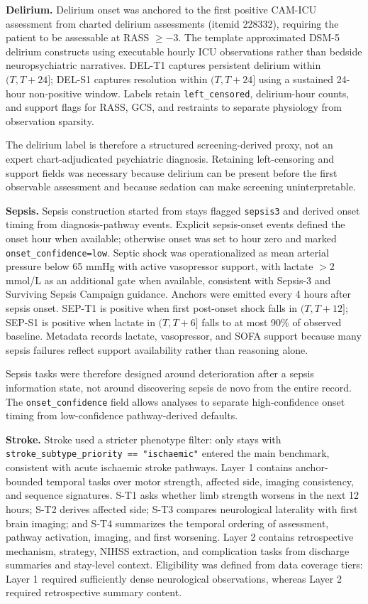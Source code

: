 \documentclass[pdflatex,sn-nature]{sn-jnl}
\begin{document}
\noindent\textbf{Delirium.} Delirium onset was anchored to the first positive CAM-ICU assessment from charted delirium assessments (itemid 228332), requiring the patient to be assessable at RASS $\geq -3$\cite{ely2001camicu}. The template approximated DSM-5 delirium constructs using executable hourly ICU observations rather than bedside neuropsychiatric narratives\cite{apa2013dsm5}. DEL-T1 captures persistent delirium within $(T, T+24]$; DEL-S1 captures resolution within $(T, T+24]$ using a sustained 24-hour non-positive window. Labels retain \texttt{left\_censored}, delirium-hour counts, and support flags for RASS, GCS, and restraints to separate physiology from observation sparsity.

The delirium label is therefore a structured screening-derived proxy, not an expert chart-adjudicated psychiatric diagnosis. Retaining left-censoring and support fields was necessary because delirium can be present before the first observable assessment and because sedation can make screening uninterpretable.

\noindent\textbf{Sepsis.} Sepsis construction started from stays flagged \texttt{sepsis3} and derived onset timing from diagnosis-pathway events. Explicit sepsis-onset events defined the onset hour when available; otherwise onset was set to hour zero and marked \texttt{onset\_confidence=low}. Septic shock was operationalized as mean arterial pressure below 65 mmHg with active vasopressor support, with lactate $>2$ mmol/L as an additional gate when available, consistent with Sepsis-3 and Surviving Sepsis Campaign guidance\cite{singer2016sepsis3,evans2021surviving}. Anchors were emitted every 4 hours after sepsis onset. SEP-T1 is positive when first post-onset shock falls in $(T, T+12]$; SEP-S1 is positive when lactate in $(T, T+6]$ falls to at most 90\% of observed baseline. Metadata records lactate, vasopressor, and SOFA support because many sepsis failures reflect support availability rather than reasoning alone.

Sepsis tasks were therefore designed around deterioration after a sepsis information state, not around discovering sepsis de novo from the entire record. The \texttt{onset\_confidence} field allows analyses to separate high-confidence onset timing from low-confidence pathway-derived defaults.

\noindent\textbf{Stroke.} Stroke used a stricter phenotype filter: only stays with \texttt{stroke\_subtype\_priority == "ischaemic"} entered the main benchmark, consistent with acute ischaemic stroke pathways\cite{berge2021eso}. Layer 1 contains anchor-bounded temporal tasks over motor strength, affected side, imaging consistency, and sequence signatures. S-T1 asks whether limb strength worsens in the next 12 hours; S-T2 derives affected side; S-T3 compares neurological laterality with first brain imaging; and S-T4 summarizes the temporal ordering of assessment, pathway activation, imaging, and first worsening. Layer 2 contains retrospective mechanism, strategy, NIHSS extraction, and complication tasks from discharge summaries and stay-level context. Eligibility was defined from data coverage tiers: Layer 1 required sufficiently dense neurological observations, whereas Layer 2 required retrospective summary content.
\end{document}
